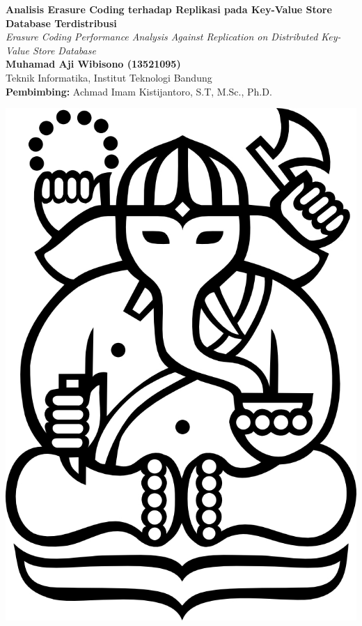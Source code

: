 \documentclass[a0,landscape]{config/poster/a0poster}
\begin{document}

\begin{minipage}[c]{0.75\linewidth}
	\veryHuge \textbf{Analisis Erasure Coding terhadap Replikasi pada Key-Value Store Database Terdistribusi} \\[1cm]
	\Huge \textit{Erasure Coding Performance Analysis Against Replication on Distributed Key-Value Store Database} \\[1.5cm]
	\LARGE \textbf{Muhamad Aji Wibisono (13521095)} \\
	\Large Teknik Informatika, Institut Teknologi Bandung \\
	\Large \textbf{Pembimbing:} Achmad Imam Kistijantoro, S.T, M.Sc., Ph.D.
\end{minipage}
\begin{minipage}[c]{0.2\linewidth}
	\includegraphics[width=\linewidth]{resources/cover-ganesha.jpg}
\end{minipage}
\end{document}
